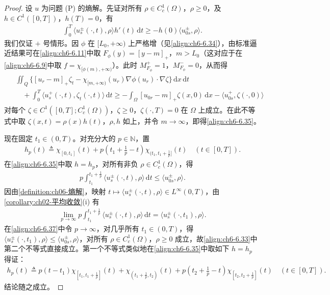 \documentclass[../../main.tex]{subfiles}%
\begin{document}
\begin{proof}
设 $u$ 为问题 (P) 的熵解。先证对所有 $\rho\in C^1_c(\Omega)$，$\rho\geqslant0$，及 $h\in C^1([0,T])$，$h(T)=0$，有
\begin{align}
\int_0^T\langle u^\pm_s(\cdot,t),\rho\rangle h'(t)\,\mathrm{d}t\geqslant-h(0)\langle u^\pm_{0s},\rho\rangle. \label{align:ch6-6.35}
\end{align}
我们仅证 $+$ 号情形。因 $\phi$ 在 $[L_0,+\infty)$ 上严格增（见\eqref{align:ch6-6.34}），由标准逼近结果可在\eqref{align:ch6-6.11}中取 $F_\phi(y)=[y-m]_+$，$m>L_0$（这对应于在\eqref{align:ch6-6.9}中取 $f=\chi_{[\phi(m),+\infty)}$）。此时 $M^+_{F_\phi}=1$，$M^-_{F_\phi}=0$，从而得
\begin{align}
\begin{aligned}
&\iint_Q\{[u_r-m]_+\zeta_t-\chi_{[m,+\infty)}(u_r)\nabla\phi(u_r)\cdot\nabla\zeta\}\,\mathrm{d}x\,\mathrm{d}t\\
&\quad+\int_0^T\langle u^+_s(\cdot,t),\zeta_t(\cdot,t)\rangle\,\mathrm{d}t
\geqslant-\int_\Omega[u_{0r}-m]_+\zeta(x,0)\,\mathrm{d}x-\langle u^+_{0s},\zeta(\cdot,0)\rangle
\end{aligned} \label{align:ch6-6.36}
\end{align}
对每个 $\zeta\in C^1([0,T];C^1_c(\Omega))$，$\zeta\geqslant0$，$\zeta(\cdot,T)=0$ 在 $\Omega$ 上成立。在此不等式中取 $\zeta(x,t)=\rho(x)h(t)$，$\rho,h$ 如上，并令 $m\to\infty$，即得\eqref{align:ch6-6.35}。

现在固定 $t_1\in(0,T)$。对充分大的 $p\in\mathbb{N}$，置
\begin{align*}
h_p(t)\triangleq \chi_{[0,t_1]}(t)+p\left(t_1+\frac{1}{p}-t\right)\chi_{(t_1,t_1+\frac{1}{p}]}(t) \quad(t\in[0,T]).
\end{align*}
在\eqref{align:ch6-6.35}中取 $h=h_p$，对所有非负 $\rho\in C^1_c(\Omega)$，得
\begin{align}
p\int_{t_1}^{t_1+\frac{1}{p}}\langle u^\pm_s(\cdot,t),\rho\rangle\,\mathrm{d}t\leqslant\langle u^\pm_{0s},\rho\rangle. \label{align:ch6-6.37}
\end{align}
因由\cref{definition:ch06-熵解}，映射 $t\mapsto\langle u^\pm_s(\cdot,t),\rho\rangle\in L^\infty(0,T)$，由\cref{corollary:ch02-平均收敛}(i) 有
\begin{align*}
\lim_{p\to\infty}p\int_{t_1}^{t_1+\frac{1}{p}}\langle u^\pm_s(\cdot,t),\rho\rangle\,\mathrm{d}t
=\langle u^\pm_s(\cdot,t_1),\rho\rangle.
\end{align*}
在\eqref{align:ch6-6.37}中令 $p\to\infty$，对几乎所有 $t_1\in(0,T)$，得 $\langle u^\pm_s(\cdot,t_1),\rho\rangle\leqslant\langle u^\pm_{0s},\rho\rangle$，对所有 $\rho\in C^1_c(\Omega)$，$\rho\geqslant0$ 成立，故\eqref{align:ch6-6.33}中第二个不等式直接成立。第一个不等式类似地在\eqref{align:ch6-6.35}中取如下 $h=h_p$ 得证：
\begin{align*}
h_p(t)\triangleq p(t-t_1)\chi_{[t_1,t_1+\frac{1}{p}]}(t)
+\chi_{(t_1+\frac{1}{p},t_2)}(t)
+p\left(t_2+\frac{1}{p}-t\right)\chi_{[t_2,t_2+\frac{1}{p}]}(t)
\quad(t\in[0,T]).
\end{align*}
结论随之成立。
\end{proof}
\end{document}
